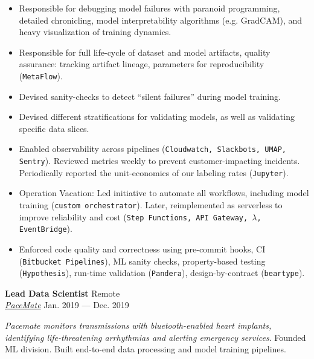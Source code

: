 \documentclass[a4paper,12pt]{article}
\newcommand{\ressubheading}[4]{{\begin{minipage}{\textwidth}
                                    \textbf{#1} \hfill #2 \\
                                    \textit{#3} \hfill #4 \\
\end{minipage}}}
\begin{document}
\begin{itemize}
        \begin{itemize}
            \item Responsible for debugging model failures with paranoid programming, detailed chronicling, model interpretability algorithms (e.g. GradCAM),  and heavy visualization of training dynamics.
            \item Responsible for full life-cycle of dataset and model artifacts, quality assurance:
            tracking artifact lineage, parameters for reproducibility (\texttt{MetaFlow}).
            \item Devised sanity-checks to detect ``silent failures'' during model training. 
            \item Devised different stratifications for validating models, as well as validating specific data slices. 
            \item Enabled observability across pipelines (\texttt{Cloudwatch, Slackbots, UMAP, Sentry}). Reviewed metrics weekly to prevent customer-impacting incidents. Periodically reported the unit-economics of our labeling rates (\texttt{Jupyter}).
            \item Operation Vacation: Led initiative to automate all workflows, including model training (\texttt{custom orchestrator}). Later, reimplemented as serverless to improve reliability and cost (\texttt{Step Functions, API Gateway, $\lambda$, EventBridge}).
            \item Enforced code quality and correctness using pre-commit hooks, CI (\texttt{Bitbucket Pipelines}), ML sanity checks, property-based testing (\texttt{Hypothesis}), run-time validation (\texttt{Pandera}), design-by-contract (\texttt{beartype}).
        \end{itemize}

    \end{itemize}


    \ressubheading{Lead Data Scientist}{Remote}{\href{https://pacemate.com/}{PaceMate}}{Jan. 2019 --- Dec. 2019}

    \vspace{-6pt} \textit{Pacemate monitors transmissions with bluetooth-enabled heart implants, identifying life-threatening arrhythmias and alerting emergency services}. Founded ML division. Built end-to-end data processing and model training pipelines.
\end{document}
